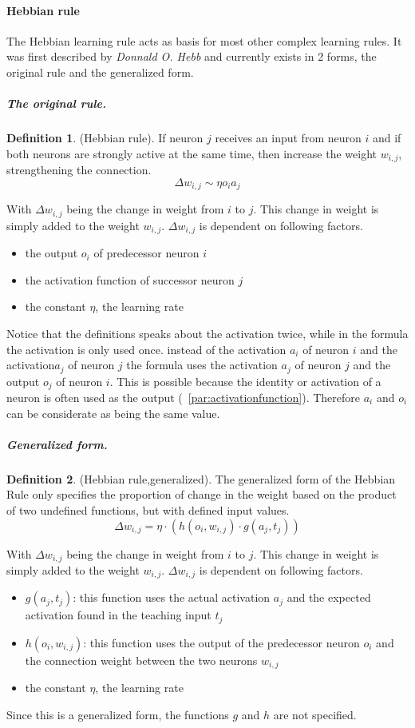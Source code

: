 \documentclass[pdftex,a4paper,12pt,twoside]{report}
\theoremstyle{plain} \newtheorem{theorem}{Theorem} \newtheorem{proposition}{Proposition} \newtheorem{lemma}{Lemma} \newtheorem*{corollary}{Corollary}
\theoremstyle{definition} \newtheorem{definition}{Definition} \newtheorem{conjecture}{Conjecture} \newtheorem*{example}{Example} \newtheorem{algorithm}{Algorithm}
\theoremstyle{remark} \newtheorem*{remark}{Remark} \newtheorem*{note}{Note} \newtheorem{case}{Case}
\begin{document}
\paragraph{Hebbian rule}
The Hebbian learning rule acts as basis for most other complex learning rules. It was first described by \emph{Donnald O. Hebb} \citep{Hebb1949} and currently exists in 2 forms, the original rule and the generalized form.
\subparagraph{The original rule.}
\begin{definition}
(Hebbian rule). If neuron $j$ receives an input from neuron $i$ and if both neurons are strongly active at the same time, then increase the weight $w_{i,j}$, strengthening the connection.
\begin{equation}
\Delta w_{i,j} \sim \eta o_ia_j
\end{equation}
\end{definition}
With $\Delta w_{i,j}$ being the change in weight from $i$ to $j$. This change in weight is simply added to the weight $w_{i,j}$. $\Delta w_{i,j}$ is dependent on following factors.
\begin{itemize}
\item the output $o_i$ of predecessor neuron $i$
\item the activation function of successor neuron $j$
\item the constant $\eta$, the learning rate
\end{itemize}
Notice that the definitions speaks about the activation twice, while in the formula the activation is only used once. instead of the activation $a_i$ of neuron $i$ and the activation$a_j$ of neuron $j$ the formula uses the activation $a_j$ of neuron $j$ and the output $o_j$ of neuron $i$. This is possible because the identity or activation of a neuron is often used as the output (~\ref{par:activationfunction}). Therefore $a_i$ and $o_i$ can be considerate as being the same value.
\subparagraph{Generalized form.}
\begin{definition}
(Hebbian rule,generalized). The generalized form of the Hebbian Rule only specifies the proportion of change in the weight based on the product of two undefined functions, but with defined input values.
\begin{equation}
\Delta w_{i,j} = \eta \cdot (h(o_i,w_{i,j}) \cdot g(a_j,t_j))
\end{equation}
\end{definition}
\label{equa:generalizedHebbian}
With $\Delta w_{i,j}$ being the change in weight from $i$ to $j$. This change in weight is simply added to the weight $w_{i,j}$. $\Delta w_{i,j}$ is dependent on following factors.
\begin{itemize}
\item $g(a_j,t_j)$: this function uses the actual activation $a_j$ and the expected activation found in the teaching input $t_j$
\item $h(o_i,w_{i,j})$: this function uses the output of the predecessor neuron $o_i$ and the connection weight between the two neurons $w_{i,j}$
\item the constant $\eta$, the learning rate
\end{itemize}
Since this is a generalized form, the functions $g$ and $h$ are not specified.
\end{document}
